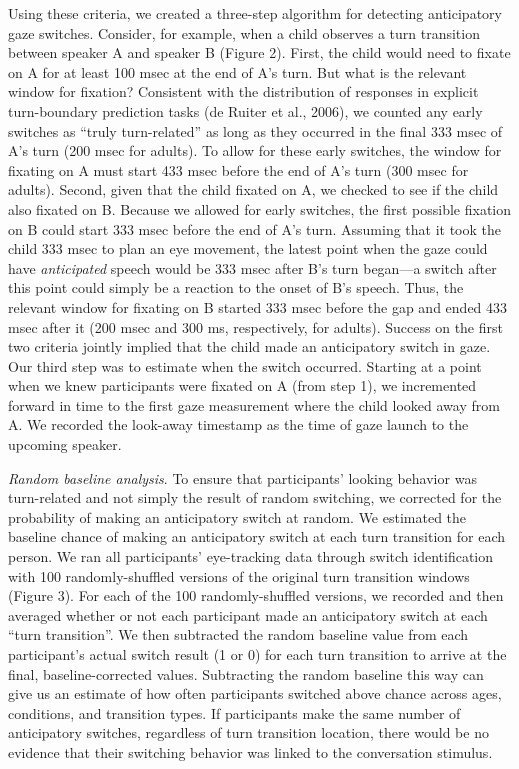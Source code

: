 \documentclass[authoryear, 12pt]{elsarticle}
\begin{document}
Using these criteria, we created a three-step algorithm for detecting anticipatory gaze switches. Consider, for example, when a child observes a turn transition between speaker A and speaker B (Figure 2). First, the child would need to fixate on A for at least 100 msec at the end of A's turn. But what is the relevant window for fixation? Consistent with the distribution of responses in explicit turn-boundary prediction tasks (de Ruiter et al., 2006), we counted any early switches as ``truly turn-related'' as long as they occurred in the final 333 msec of A's turn (200 msec for adults). To allow for these early switches, the window for fixating on A must start 433 msec before the end of A's turn (300 msec for adults). Second, given that the child fixated on A, we checked to see if the child also fixated on B. Because we allowed for early switches, the first possible fixation on B could start 333 msec before the end of A's turn. Assuming that it took the child 333 msec to plan an eye movement, the latest point when the gaze could have \textit{anticipated} speech would be 333 msec after B's turn began---a switch after this point could simply be a reaction to the onset of B's speech. Thus, the relevant window for fixating on B started 333 msec before the gap and ended 433 msec after it (200 msec and 300 ms, respectively, for adults). Success on the first two criteria jointly implied that the child made an anticipatory switch in gaze. Our third step was to estimate when the switch occurred. Starting at a point when we knew participants were fixated on A (from step 1), we incremented forward in time to the first gaze measurement where the child looked away from A. We recorded the look-away timestamp as the time of gaze launch to the upcoming speaker.

\textit{Random baseline analysis}. To ensure that participants' looking behavior was turn-related and not simply the result of random switching, we corrected for the probability of making an anticipatory switch at random. We estimated the baseline chance of making an anticipatory switch at each turn transition for each person. We ran all participants' eye-tracking data through switch identification with 100 randomly-shuffled versions of the original turn transition windows (Figure 3). For each of the 100 randomly-shuffled versions, we recorded and then averaged whether or not each participant made an anticipatory switch at each ``turn transition''. We then subtracted the random baseline value from each participant's actual switch result (1 or 0) for each turn transition to arrive at the final, baseline-corrected values. Subtracting the random baseline this way can give us an estimate of how often participants switched above chance across ages, conditions, and transition types. If participants make the same number of anticipatory switches, regardless of turn transition location, there would be no evidence that their switching behavior was linked to the conversation stimulus. 
\end{document}
